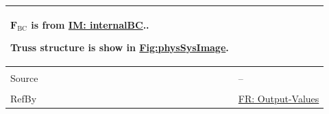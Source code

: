 \documentclass[12pt]{article}
\begin{document}
\begin{minipage}{\textwidth}
\begin{tabular}{>{\raggedright}p{}>{\raggedright\arraybackslash}p{}}
        ${\mathbf{F}_{\text{BC}}}$ is from \hyperref[IM:internalBC]{IM: internalBC}..
        
        Truss structure is show in \hyperref[Figure:physSysImage]{Fig:physSysImage}.
        
\\ \midrule \\
Source & --
         
\\ \midrule \\
RefBy & \hyperref[outputValues]{FR: Output-Values}
        
\\ \bottomrule
\end{tabular}
\end{minipage}

\vspace{\baselineskip}
\noindent
\end{document}
